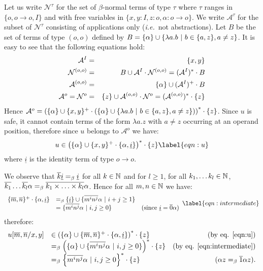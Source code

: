 Let us write $\mathcal{N}^\tau$ for the set of $\beta$-normal terms of
type $\tau$ where $\tau$ ranges in $\{ o, o\rightarrow o, I \}$ and
with free variables in $\{ x,y:I, z:o, \alpha:o\rightarrow o\}$. We
write $\mathcal{A}^\tau$ for the subset of $\mathcal{N}^\tau$
consisting of applications only ({\it i.e.}~not abstractions).
Let $B$ be the set of terms of type $(o,o)$ defined by $B = \{ \alpha \} \cup \{ \lambda a.b \ | \ b \in \{a,z\}, a \neq z \}$.
It is easy to see that the following equations hold:
\begin{eqnarray*}
\mathcal{A}^I &=& \{ x,y \} \\
\mathcal{N}^{(o,o)} &=& B \cup \mathcal{A}^I \cdot
\mathcal{N}^{(o,o)} = (\mathcal{A}^I)^* \cdot B \\
\mathcal{A}^{(o,o)} &=& \{ \alpha \} \cup (\mathcal{A}^I)^+ \cdot B \\
\mathcal{A}^o = \mathcal{N}^o &=& \{ z \} \cup \mathcal{A}^{(o,o)} \cdot \mathcal{N}^o = (\mathcal{A}^{(o,o)})^* \cdot \{ z \}
\end{eqnarray*}
Hence $\mathcal{A}^o = \left( \{\alpha \} \cup \{x,y\}^+ \cdot \left( \{\alpha \} \cup \{\lambda a.b \ | \ b \in \{a,z\}, a \neq z \} \right) \right)^* \cdot \{ z \}$.
Since $u$ is safe, it cannot contain terms of the form $\lambda a . z$ with $a \neq z$ occurring at an operand position, therefore since $u$ belongs to $\mathcal{A}^o$ we have:
\begin{equation}
u \in \left( \{\alpha\} \union \{x,y\}^+ \cdot \{\alpha,
\underline{i} \} \right)^* \cdot \{ z \} \label{eqn:u}
\end{equation}
where $\underline{i}$ is the identity term of type $o\rightarrow o$.


We observe that $\overline{k} \underline{i} =_\beta \underline{i}$ for all $k \in \mathbb{N}$ and for $l\geq 1$, for all $k_1, \ldots k_l \in \mathbb{N}$,
$\overline{k_1}\ldots \overline{k_l} \alpha =_\beta
\overline{k_1\times \ldots \times k_l} \alpha$. Hence for all $m,n \in \mathbb{N}$ we have:
\begin{equation}
\begin{array}{llr}
\{\encode{m},\encode{n}\}^+ \cdot \{\alpha, \underline{i} \} &=_\beta
\{ \underline{i} \} \union
\{ \encode{m^i n^j} \alpha \ |\ i+j \geq 1 \} \nonumber \\
&= \{ \encode{m^i n^j} \alpha \ |\ i,j \geq 0 \} & ( \mbox{since } \underline{i} = \encode{0} \alpha) \end{array}
\label{eqn:intermediate}
\end{equation}
therefore:
$$\begin{array}{llr}
u[\overline{m}, \overline{n}/x,y] &\in \left( \{ \alpha \} \cup \{\overline{m},\overline{n}\}^+ \cdot \{\alpha, \underline{i} \} \right)^* \cdot \{ z \}  & \mbox{(by eq. \ref{eqn:u})} \\
&=_\beta \left( \{\alpha \} \cup \{ \overline{m^i n^j}
\alpha \ | \ i,j \geq 0 \} \right)^* \cdot \{ z \} & \mbox{(by eq. \ref{eqn:intermediate})}  \\
&=_\beta \left\{ \overline{m^i n^j}
\alpha \ | \ i,j \geq 0 \right\}^* \cdot \{ z \} & \mbox{($\alpha z =_\beta \overline{1} \alpha z$)}.
\end{array}$$

